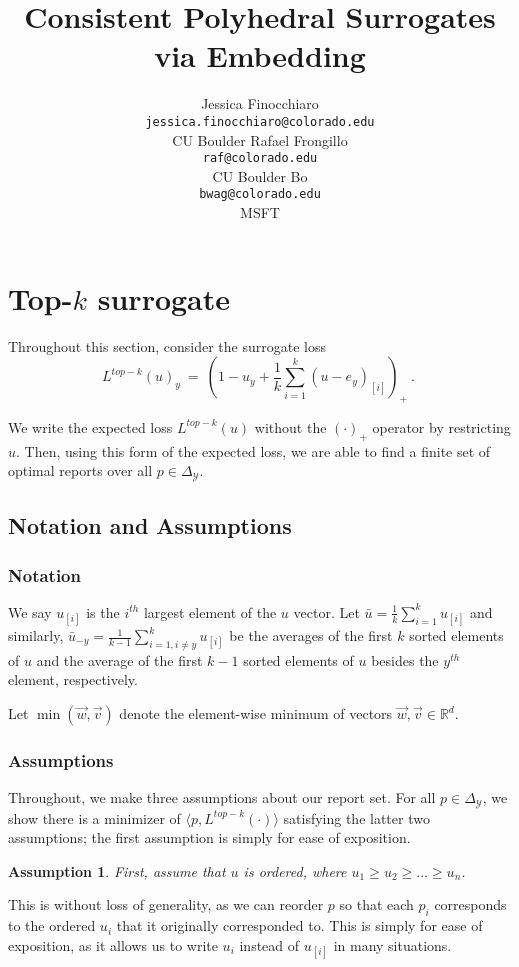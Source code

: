 \documentclass[12pt]{article}
\title{Consistent Polyhedral Surrogates via Embedding}
\author{%
 Jessica Finocchiaro\raf{Jessie?} \\
 \texttt{jessica.finocchiaro@colorado.edu}\\
 CU Boulder
 \And
 Rafael Frongillo\\
 \texttt{raf@colorado.edu}\\
 CU Boulder
 \And
 Bo\\
 \texttt{bwag@colorado.edu}\\
 MSFT
}
\newcommand{\reals}{\mathbb{R}}
\newcommand{\simplex}{\Delta_\Y}
\newcommand{\Y}{\mathcal{Y}}
\newcommand{\inprod}[2]{\langle #1, #2 \rangle}%
\DeclareMathOperator*{\argmax}{arg\,max}
\newtheorem{assumption}{Assumption}
\begin{document}
\section{Top-$k$ surrogate}

Throughout this section, consider the surrogate loss \begin{equation}\label{eq:top-k-surrogate}
L^{top-k}(u)_y~=~\left(1 - u_y + \frac{1}{k} \sum_{i=1}^k (u - e_y)_{[i]} \right)_+~.~
\end{equation}

We write the expected loss $L^{top-k}(u)$ without the $(\cdot)_+$ operator by restricting $u$.
Then, using this form of the expected loss, we are able to find a finite set of optimal reports over all $p \in \simplex$.

\subsection{Notation and Assumptions}
\subsubsection{Notation}
We say $u_{[i]}$ is the $i^{th}$ largest element of the $u$ vector.
Let $\bar{u} = \frac 1 k \sum_{i = 1}^k u_{[i]}$ and similarly, $\bar{u}_{-y} = \frac{1}{k-1} \sum_{i=1, i \neq y}^k u_{[i]}$ be the averages of the first $k$ sorted elements of $u$ and the average of the first $k-1$ sorted elements of $u$ besides the $y^{th}$ element, respectively.

Let $\min(\vec w, \vec v)$ denote the element-wise minimum of vectors $\vec w, \vec v \in \reals^d$.

\subsubsection{Assumptions}\label{sec:assumptions}
Throughout, we make three assumptions about our report set. 
For all $p \in \simplex$, we show there is a minimizer of $\inprod{p}{L^{top-k}(\cdot)}$ satisfying the latter two assumptions; the first assumption is simply for ease of exposition.

\begin{assumption}\label{assum:ordered-u}
First, assume that $u$ is ordered, where $u_1 \geq u_2 \geq \ldots \geq u_n$.
\end{assumption}
This is without loss of generality, as we can reorder $p$ so that each $p_i$ corresponds to the ordered $u_i$ that it originally corresponded to.
This is simply for ease of exposition, as it allows us to write $u_i$ instead of $u_{[i]}$ in many situations. 
\end{document}
